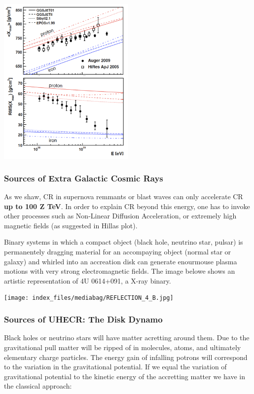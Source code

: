 \documentclass[
  letterpaper,
  DIV=11,
  numbers=noendperiod]{scrreprt}
\begin{document}
\begin{center}
\includegraphics[width=0.5\textwidth,height=\textheight]{images/AugerUHECRComp.png}
\end{center}

\subsubsection{Sources of Extra Galactic Cosmic
Rays}\label{sources-of-extra-galactic-cosmic-rays}

As we shaw, CR in supernova remmants or blast waves can only accelerate
CR \textbf{up to 100 Z TeV}. In order to explain CR beyond this energy,
one has to invoke other processes such as Non-Linear Diffusion
Acceleration, or extremely high magnetic fields (as suggested in Hillas
plot).

Binary systems in which a compact object (black hole, neutrino star,
pulsar) is permanentely dragging material for an accompaying object
(normal star or galaxy) and whirled into an accreation disk can generate
enourmouse plasma motions with very strong electromagnetic fields. The
image belowe shows an artistic representation of 4U 0614+091, a X-ray
binary.

\begin{center}
\texttt{[image: index\_files/mediabag/REFLECTION\_4\_B.jpg]}
\end{center}

\subsubsection{Sources of UHECR: The Disk
Dynamo}\label{sources-of-uhecr-the-disk-dynamo}

Black holes or neutrino stars will have matter acretting around them.
Due to the gravitational pull matter will be ripped of in molecules,
atoms, and ultimately elementary charge particles. The energy gain of
infalling potrons will correspond to the variation in the gravitational
potential. If we equal the variation of gravitational potential to the
kinetic energy of the accretting matter we have in the classical
approach:
\end{document}
